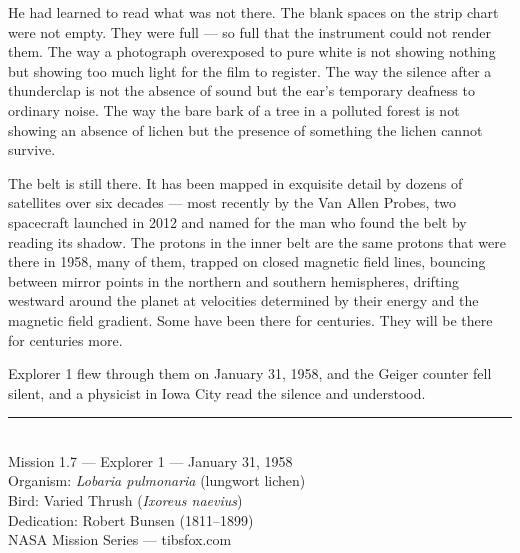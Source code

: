 \documentclass[12pt, letterpaper]{article}
\begin{document}
He had learned to read what was not there. The blank spaces on the strip chart were not empty. They were full --- so full that the instrument could not render them. The way a photograph overexposed to pure white is not showing nothing but showing too much light for the film to register. The way the silence after a thunderclap is not the absence of sound but the ear's temporary deafness to ordinary noise. The way the bare bark of a tree in a polluted forest is not showing an absence of lichen but the presence of something the lichen cannot survive.

The belt is still there. It has been mapped in exquisite detail by dozens of satellites over six decades --- most recently by the Van Allen Probes, two spacecraft launched in 2012 and named for the man who found the belt by reading its shadow. The protons in the inner belt are the same protons that were there in 1958, many of them, trapped on closed magnetic field lines, bouncing between mirror points in the northern and southern hemispheres, drifting westward around the planet at velocities determined by their energy and the magnetic field gradient. Some have been there for centuries. They will be there for centuries more.

Explorer 1 flew through them on January 31, 1958, and the Geiger counter fell silent, and a physicist in Iowa City read the silence and understood.

\vfill

\begin{center}
\small
\rule{0.3\textwidth}{0.4pt}\\[0.5em]
Mission 1.7 --- Explorer 1 --- January 31, 1958\\
Organism: \textit{Lobaria pulmonaria} (lungwort lichen)\\
Bird: Varied Thrush (\textit{Ixoreus naevius})\\
Dedication: Robert Bunsen (1811--1899)\\[0.3em]
NASA Mission Series --- tibsfox.com
\end{center}
\end{document}
